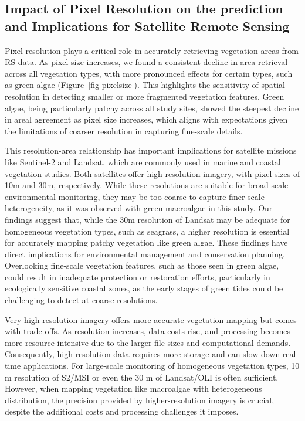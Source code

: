 \documentclass[
  letterpaper,
  11pt,
  english,
  singlespacing,
  headsepline]{MastersDoctoralThesis}
\begin{document}
\begin{spacing}{1.5}
\subsection{Impact of Pixel Resolution on the prediction and
Implications for Satellite Remote
Sensing}\label{impact-of-pixel-resolution-on-the-prediction-and-implications-for-satellite-remote-sensing}

Pixel resolution plays a critical role in accurately retrieving
vegetation areas from RS data. As pixel size increases, we found a
consistent decline in area retrieval across all vegetation types, with
more pronounced effects for certain types, such as green algae
(Figure~\ref{fig-pixelsize}). This highlights the sensitivity of spatial
resolution in detecting smaller or more fragmented vegetation features.
Green algae, being particularly patchy across all study sites, showed
the steepest decline in areal agreement as pixel size increases, which
aligns with expectations given the limitations of coarser resolution in
capturing fine-scale details.

This resolution-area relationship has important implications for
satellite missions like Sentinel-2 and Landsat, which are commonly used
in marine and coastal vegetation studies. Both satellites offer
high-resolution imagery, with pixel sizes of 10m and 30m, respectively.
While these resolutions are suitable for broad-scale environmental
monitoring, they may be too coarse to capture finer-scale heterogeneity,
as it was observed with green macroalgae in this study. Our findings
suggest that, while the 30m resolution of Landsat may be adequate for
homogeneous vegetation types, such as seagrass, a higher resolution is
essential for accurately mapping patchy vegetation like green algae.
These findings have direct implications for environmental management and
conservation planning. Overlooking fine-scale vegetation features, such
as those seen in green algae, could result in inadequate protection or
restoration efforts, particularly in ecologically sensitive coastal
zones, as the early stages of green tides could be challenging to detect
at coarse resolutions.

Very high-resolution imagery offers more accurate vegetation mapping but
comes with trade-offs. As resolution increases, data costs rise, and
processing becomes more resource-intensive due to the larger file sizes
and computational demands. Consequently, high-resolution data requires
more storage and can slow down real-time applications. For large-scale
monitoring of homogeneous vegetation types, 10 m resolution of S2/MSI or
even the 30 m of Landsat/OLI is often sufficient. However, when mapping
vegetation like macroalgae with heterogeneous distribution, the
precision provided by higher-resolution imagery is crucial, despite the
additional costs and processing challenges it imposes.


\end{spacing}
\end{document}
